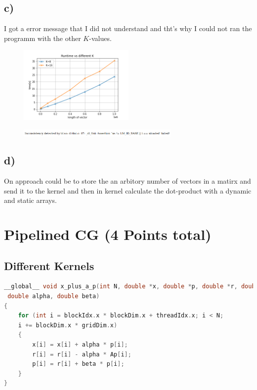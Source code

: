 \documentclass[11pt,a4paper]{article}
\begin{document}
\subsection*{c)}
I got a error message that I did not understand and tht's why I could not ran the programm with the other $K$-values.
\begin{figure}[H]
	\centering
	\includegraphics[width=0.5\textwidth]{Bilder/runtime_vs_K}
\end{figure}
\begin{figure}[H]
	\centering
	\includegraphics[width=0.7\textwidth]{Error}
\end{figure}
\subsection*{d)}
On approach could be to store the an arbitory number of vectors in a matirx and send it to the kernel and then in kernel calculate the dot-product with a dynamic and static arrays.
\newpage
\section*{Pipelined CG (4 Points total)}
\subsection*{Different Kernels}
\begin{lstlisting}[language=C++, caption={kernel line 7 to 9)}]
 __global__ void x_plus_a_p(int N, double *x, double *p, double *r, double *Ap,
 double alpha, double beta)
{
	for (int i = blockIdx.x * blockDim.x + threadIdx.x; i < N; 
	i += blockDim.x * gridDim.x)
	{
		x[i] = x[i] + alpha * p[i];
		r[i] = r[i] - alpha * Ap[i];
		p[i] = r[i] + beta * p[i];
	}
}
\end{lstlisting}
\end{document}
